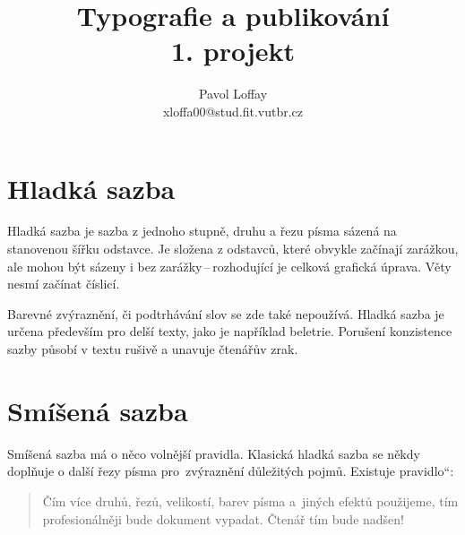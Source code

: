 \documentclass[10pt,a4paper,twocolumn]{article}
\newcommand\czuv[1]{\quotedblbase #1\textquotedblleft}
\begin{document}
 

\title{Typografie a publikování\\1. projekt}
\author{Pavol Loffay\\xloffa00@stud.fit.vutbr.cz}
\date{}
\maketitle

\section{Hladká sazba}
Hladká sazba je sazba z jednoho stupně, druhu a řezu písma sázená na stanovenou šířku odstavce. Je složena z odstavců, které obvykle začínají zarážkou, ale mohou být sázeny i bez zarážky\,--\,rozhodující je celková grafická úprava. Věty nesmí začínat číslicí.

Barevné zvýraznění, či podtrhávání slov se zde také nepoužívá. Hladká sazba je určena především pro delší texty, jako je například beletrie. Porušení konzistence sazby působí v textu rušivě a unavuje čtenářův zrak.

\section{Smíšená sazba}

Smíšená sazba má o něco volnější pravidla. Klasická hlad\-ká sazba se někdy doplňuje o další řezy písma pro~zvýraznění důležitých pojmů. Existuje \czuv{pravidlo}:

\begin{quote}Čím více druhů, řezů, velikostí, barev písma a~jiných efektů použijeme, tím profesionálněji bude dokument vypadat. Čtenář tím bude nadšen!\end{quote}
\end{document}
